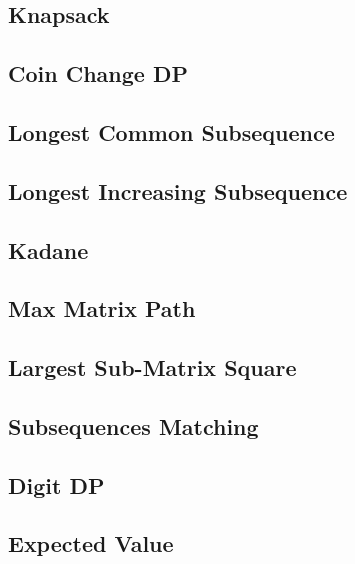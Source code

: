 \subsection{Knapsack}
\raggedbottom
\hrulefill
\subsection{Coin Change DP}
\raggedbottom
\hrulefill
\subsection{Longest Common Subsequence}
\raggedbottom
\hrulefill
\subsection{Longest Increasing Subsequence}
\raggedbottom
\hrulefill
\subsection{Kadane}
\raggedbottom
\hrulefill
\subsection{Max Matrix Path}
\raggedbottom
\hrulefill
\subsection{Largest Sub-Matrix Square}
\raggedbottom
\hrulefill
\subsection{Subsequences Matching}
\raggedbottom
\hrulefill
\subsection{Digit DP}
\raggedbottom
\hrulefill
\subsection{Expected Value}
\raggedbottom
\hrulefill
